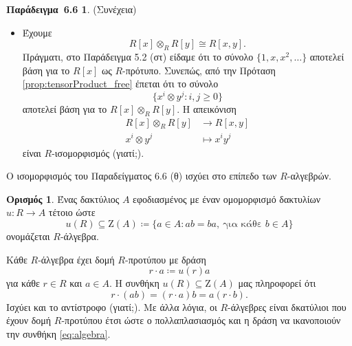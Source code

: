 \documentclass[12pt,a4paper,reqno]{amsart}
\theoremstyle{definition}
\newtheorem{definition}[theorem]{Ορισμός}
\newtheorem*{example_6.6}{Παράδειγμα~6.6}
\theoremstyle{remark}
\numberwithin{theorem}{section}
\numberwithin{exercise}{section}
\numberwithin{equation}{section}
\newcommand{\rmZ}{\mathrm{Z}}
\renewcommand{\to}{\rightarrow}
\begin{document}
\begin{example_6.6}{\rm(Συνέχεια)}
\begin{itemize}
        Γενικότερα, αν $A = (a_{ij})_{\substack{1 \le i \le n\\ 1 \le j \le m}}$, τότε
        \[
        A \otimes B \mapsto
        \begin{pmatrix}
            a_{11}B & a_{12}B & \cdots & a_{1m}B \\
            a_{21}B & a_{22}B & \cdots & a_{2m}B \\
            \vdots & \vdots &        & \vdots \\
            a_{n1}B & a_{n2}B & \cdots & a_{nm}B
        \end{pmatrix} 
        \]
        όπου στο δεξί μέλος έχουμε τον μπλόκ-πίνακα του οποίου το $(i,j)$-μπλοκ είναι ο πίνακας $a_{ij}B$. Ο πίνακας αυτός ονομάζεται \emph{γινόμενο Kronecker} των $A$ και $B$.
        \item[(θ)] Έχουμε 
        \[
        R[x] \otimes_R R[y] \cong R[x,y].
        \]
        Πράγματι, στο Παράδειγμα 5.2 (στ) είδαμε ότι το σύνολο $\{1, x, x^2, \dots\}$ αποτελεί βάση για το $R[x]$ ως $R$-πρότυπο. Συνεπώς, από την Πρόταση \ref{prop:tensorProduct_free} έπεται ότι το σύνολο 
        \[
        \{x^i \otimes y^j : i, j \ge 0\}
        \]
        αποτελεί βάση για το $R[x] \otimes_R R[y]$. Η απεικόνιση
        \begin{align*}
            R[x] \otimes_R R[y] &\to R[x,y] \\ 
            x^i \otimes y^j &\mapsto x^iy^j
        \end{align*}
        είναι $R$-ισομορφισμός (γιατί;). 
    \end{itemize}
\end{example_6.6}

Ο ισομορφισμός του Παραδείγματος 6.6 (θ) ισχύει στο επίπεδο των $R$-αλγεβρών.
\begin{definition}
    \label{def:algebras}
    Ένας δακτύλιος $A$ εφοδιασμένος με έναν ομομορφισμό δακτυλίων $u : R \to A$ τέτοιο ώστε 
    \[     
    u(R) \subseteq \rmZ(A) \coloneqq \{a \in A : ab=ba, \ \text{για κάθε $b \in A$}\}
    \]
    ονομάζεται $R$-άλγεβρα.
\end{definition}

Κάθε $R$-άλγεβρα έχει δομή $R$-προτύπου με δράση 
\[
r\cdot{a} \coloneqq u(r)a
\]
για κάθε $r \in R$ και $a \in A$. Η συνθήκη $u(R) \subseteq \rmZ(A)$ μας πληροφορεί ότι 
\begin{equation}  
    \label{eq:algebra}
    r\cdot(ab) = (r\cdot{a})b = a(r\cdot{b}).
\end{equation}
Ισχύει και το αντίστροφο (γιατί;). Με άλλα λόγια, οι $R$-άλγεβρες είναι δκατύλιοι που έχουν δομή $R$-προτύπου έτσι ώστε ο πολλαπλασιασμός και η δράση να ικανοποιούν την συνθήκη \eqref{eq:algebra}.
\end{document}
